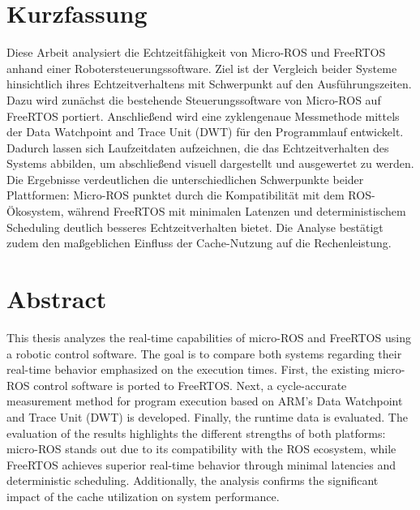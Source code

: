 \section*{Kurzfassung}

Diese Arbeit analysiert die Echtzeitfähigkeit von Micro-ROS und FreeRTOS anhand
einer Robotersteuerungssoftware. Ziel ist der Vergleich beider Systeme
hinsichtlich ihres Echtzeitverhaltens mit Schwerpunkt auf den Ausführungszeiten.
Dazu wird zunächst die bestehende Steuerungssoftware von Micro-ROS auf FreeRTOS
portiert. Anschließend wird eine zyklengenaue Messmethode mittels der Data
Watchpoint and Trace Unit (DWT) für den Programmlauf entwickelt. Dadurch lassen
sich Laufzeitdaten aufzeichnen, die das Echtzeitverhalten des Systems abbilden,
um abschließend visuell dargestellt und ausgewertet zu werden. Die Ergebnisse
verdeutlichen die unterschiedlichen Schwerpunkte beider Plattformen: Micro-ROS
punktet durch die Kompatibilität mit dem ROS-Ökosystem, während FreeRTOS mit
minimalen Latenzen und deterministischem Scheduling deutlich besseres
Echtzeitverhalten bietet. Die Analyse bestätigt zudem den maßgeblichen Einfluss
der Cache-Nutzung auf die Rechenleistung.

\section*{Abstract}

This thesis analyzes the real-time capabilities of micro-ROS and FreeRTOS using
a robotic control software. The goal is to compare both systems regarding their
real-time behavior emphasized on the execution times. First, the existing
micro-ROS control software is ported to FreeRTOS. Next, a cycle-accurate
measurement method for program execution based on ARM's Data Watchpoint and
Trace Unit (DWT) is developed. Finally, the runtime data is evaluated. The
evaluation of the results highlights the different strengths of both platforms:
micro-ROS stands out due to its compatibility with the ROS ecosystem, while
FreeRTOS achieves superior real-time behavior through minimal latencies and
deterministic scheduling. Additionally, the analysis confirms the significant
impact of the cache utilization on system performance.

